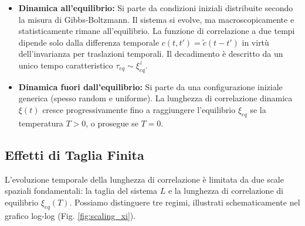 \begin{tcolorbox}[colback=colorB!10, colframe=colorB!75!colorA, coltitle=white, title=\textbf{Dinamica all'Equilibrio vs Fuori dall'Equilibrio}]
\begin{itemize}
    \item \textbf{Dinamica all'equilibrio:} Si parte da condizioni iniziali distribuite secondo la misura di Gibbs-Boltzmann. Il sistema si evolve, ma macroscopicamente e statisticamente rimane all'equilibrio. La funzione di correlazione a due tempi dipende solo dalla differenza temporale $c(t, t') = \tilde{c}(t-t')$ in virtù dell'invarianza per traslazioni temporali. Il decadimento è descritto da un unico tempo caratteristico $\tau_{eq} \sim \xi_{eq}^z$.
    \item \textbf{Dinamica fuori dall'equilibrio:} Si parte da una configurazione iniziale generica (spesso random e uniforme). La lunghezza di correlazione dinamica $\xi(t)$ cresce progressivamente fino a raggiungere l'equilibrio $\xi_{eq}$ se la temperatura $T>0$, o prosegue se $T=0$.
\end{itemize}
\end{tcolorbox}

\subsection{Effetti di Taglia Finita}
L'evoluzione temporale della lunghezza di correlazione è limitata da due scale spaziali fondamentali: la taglia del sistema $L$ e la lunghezza di correlazione di equilibrio $\xi_{eq}(T)$. Possiamo distinguere tre regimi, illustrati schematicamente nel grafico log-log (Fig. \ref{fig:scaling_xi}).

